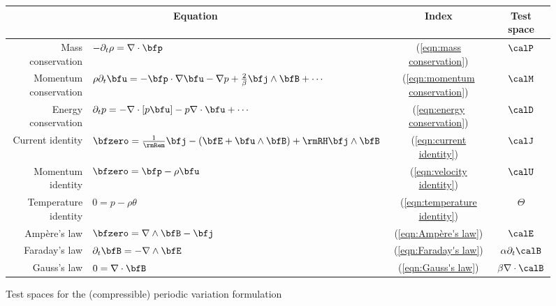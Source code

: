     \begin{figure}
        \centering
        \begin{tabular}{ r l c | c }
            \multicolumn{2}{c}{Equation}  &  Index  &  Test space  \\
            \hline\hline
            Mass conservation  &  $- \partial_{t}\rho  =  \nabla\cdot\bfp$  &  (\ref{eqn:mass conservation})  &  $\calP$  \\
            Momentum conservation  &  $\rho\partial_{t}\bfu 
             =  - \bfp\cdot\nabla\bfu - \nabla p + \frac{2}{\beta}\bfj\wedge\bfB + \cdots$  &  (\ref{eqn:momentum conservation})  &  $\calM$  \\
            Energy conservation  &  $\partial_{t}p  =  - \nabla\cdot[p\bfu] - p\nabla\cdot\bfu + \cdots$  &  (\ref{eqn:energy conservation})  &  $\calD$  \\
            \hline
            Current identity  &  $\bfzero  =  \frac{1}{\rmRem}\bfj - (\bfE + \bfu\wedge\bfB) + \rmRH\bfj\wedge\bfB$  &  (\ref{eqn:current identity})  &  $\calJ$  \\
            \hline
            Momentum identity  &  $\bfzero  =  \bfp - \rho\bfu$  &  (\ref{eqn:velocity identity})  &  $\calU$  \\
            Temperature identity  &  $0  =  p - \rho\theta$  &  (\ref{eqn:temperature identity})  &  $\Theta$  \\
            \hline
            Ampère's law  &  $\bfzero  =  \nabla\wedge\bfB - \bfj$  &  (\ref{eqn:Ampère's law})  &  $\calE$  \\
            Faraday's law  &  $\partial_{t}\bfB  =  - \nabla\wedge\bfE$  &  (\ref{eqn:Faraday's law})  &  $\alpha\partial_{t}\calB$  \\
            Gauss's law  &  $0  =  \nabla\cdot\bfB$  &  (\ref{eqn:Gauss's law})  &  $\beta\nabla\cdot\calB$  \\
        \end{tabular}
        \caption{Test spaces for the (compressible) periodic variation formulation }
        \label{fig:periodic test spaces}
    \end{figure}

